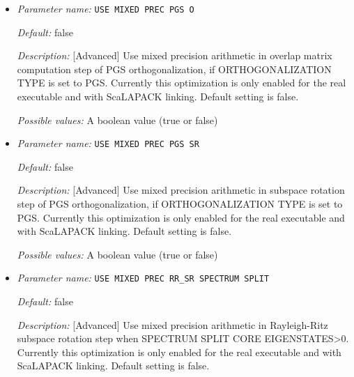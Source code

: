\begin{itemize}
{\it Possible values:} A boolean value (true or false)
\item {\it Parameter name:} {\tt USE MIXED PREC PGS O}
\label{parameters:SCF parameters/Eigen_2dsolver parameters/USE MIXED PREC PGS O}
\label{parameters:SCF_20parameters/Eigen_2dsolver_20parameters/USE_20MIXED_20PREC_20PGS_20O}




{\it Default:} false


{\it Description:} [Advanced] Use mixed precision arithmetic in overlap matrix computation step of PGS orthogonalization, if ORTHOGONALIZATION TYPE is set to PGS. Currently this optimization is only enabled for the real executable and with ScaLAPACK linking. Default setting is false.


{\it Possible values:} A boolean value (true or false)
\item {\it Parameter name:} {\tt USE MIXED PREC PGS SR}
\label{parameters:SCF parameters/Eigen_2dsolver parameters/USE MIXED PREC PGS SR}
\label{parameters:SCF_20parameters/Eigen_2dsolver_20parameters/USE_20MIXED_20PREC_20PGS_20SR}




{\it Default:} false


{\it Description:} [Advanced] Use mixed precision arithmetic in subspace rotation step of PGS orthogonalization, if ORTHOGONALIZATION TYPE is set to PGS. Currently this optimization is only enabled for the real executable and with ScaLAPACK linking. Default setting is false.


{\it Possible values:} A boolean value (true or false)
\item {\it Parameter name:} {\tt USE MIXED PREC RR\_SR SPECTRUM SPLIT}
\label{parameters:SCF parameters/Eigen_2dsolver parameters/USE MIXED PREC RR_5fSR SPECTRUM SPLIT}
\label{parameters:SCF_20parameters/Eigen_2dsolver_20parameters/USE_20MIXED_20PREC_20RR_5fSR_20SPECTRUM_20SPLIT}




{\it Default:} false


{\it Description:} [Advanced] Use mixed precision arithmetic in Rayleigh-Ritz subspace rotation step when SPECTRUM SPLIT CORE EIGENSTATES>0. Currently this optimization is only enabled for the real executable and with ScaLAPACK linking. Default setting is false.



\end{itemize}
